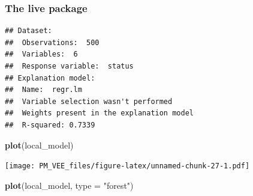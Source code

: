 \documentclass[]{krantz}
\newenvironment{Shaded}{\begin{snugshade}}{\end{snugshade}}
\newcommand{\ControlFlowTok}[1]{\textcolor[rgb]{0.13,0.29,0.53}{\textbf{#1}}}
\newcommand{\DataTypeTok}[1]{\textcolor[rgb]{0.13,0.29,0.53}{#1}}
\newcommand{\DecValTok}[1]{\textcolor[rgb]{0.00,0.00,0.81}{#1}}
\newcommand{\KeywordTok}[1]{\textcolor[rgb]{0.13,0.29,0.53}{\textbf{#1}}}
\newcommand{\NormalTok}[1]{#1}
\newcommand{\OperatorTok}[1]{\textcolor[rgb]{0.81,0.36,0.00}{\textbf{#1}}}
\newcommand{\StringTok}[1]{\textcolor[rgb]{0.31,0.60,0.02}{#1}}
\theoremstyle{definition}
\theoremstyle{definition}
\theoremstyle{definition}
\theoremstyle{remark}
\begin{document}
\hypertarget{the-live-package}{%
\subsubsection{\texorpdfstring{\textbf{The live
package}}{The live package}}\label{the-live-package}}

\begin{Shaded}
\end{Shaded}

\begin{verbatim}
## Dataset: 
##  Observations:  500 
##  Variables:  6 
##  Response variable:  status 
## Explanation model: 
##  Name:  regr.lm 
##  Variable selection wasn't performed 
##  Weights present in the explanation model 
##  R-squared: 0.7339
\end{verbatim}

\begin{Shaded}
\begin{Highlighting}[]
\KeywordTok{plot}\NormalTok{(local_model)}
\end{Highlighting}
\end{Shaded}

\texttt{[image: PM\_VEE\_files/figure-latex/unnamed-chunk-27-1.pdf]}

\begin{Shaded}
\begin{Highlighting}[]
\KeywordTok{plot}\NormalTok{(local_model, }\DataTypeTok{type =} \StringTok{"forest"}\NormalTok{)}
\end{Highlighting}
\end{Shaded}
\end{document}

